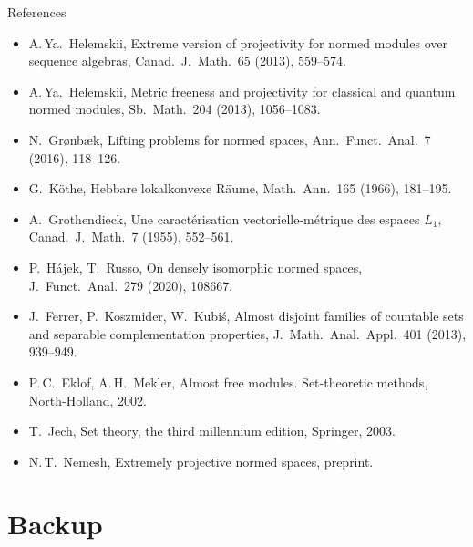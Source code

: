 \documentclass[10pt,aspectratio=169]{beamer}
\begin{document}
\begin{frame}{References}
  \footnotesize
  \begin{itemize}
    \item[] A.\,Ya.~Helemskii, Extreme version of projectivity for normed modules
      over sequence algebras, Canad.\ J.\ Math.\ 65 (2013), 559--574.
    \item[] A.\,Ya.~Helemskii, Metric freeness and projectivity for classical and
      quantum normed modules, Sb.\ Math.\ 204 (2013), 1056--1083.
    \item[] N.~Gr{\o}nb{\ae}k, Lifting problems for normed spaces, Ann.\ Funct.\ Anal.\
      7 (2016), 118--126.
    \item[] G.~K\"othe, Hebbare lokalkonvexe R\"aume, Math.\ Ann.\ 165 (1966), 181--195.
    \item[] A.~Grothendieck, Une caract\'erisation vectorielle-m\'etrique des
      espaces $L_1$, Canad.\ J.\ Math.\ 7 (1955), 552--561.
    \item[] P.~H\'ajek, T.~Russo, On densely isomorphic normed spaces,
      J.\ Funct.\ Anal.\ 279 (2020), 108667.
    \item[] J.~Ferrer, P.~Koszmider, W.~Kubi\'s, Almost disjoint families of
      countable sets and separable complementation properties,
      J.\ Math.\ Anal.\ Appl.\ 401 (2013), 939--949.
    \item[] P.\,C.~Eklof, A.\,H.~Mekler, Almost free modules. Set-theoretic
      methods, North-Holland, 2002.
    \item[] T.~Jech, Set theory, the third millennium edition, Springer, 2003.
    \item[] N.\,T.~Nemesh, Extremely projective normed spaces, preprint.
  \end{itemize}
\end{frame}

\appendix
\section*{Backup}
\end{document}
